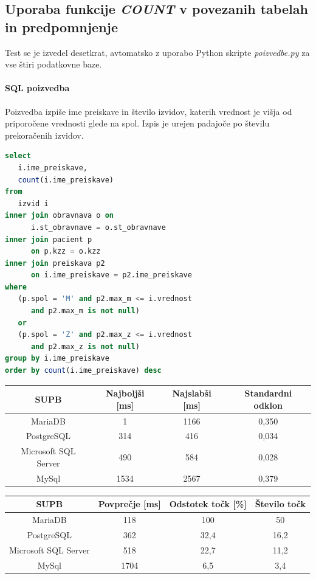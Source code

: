 \documentclass[a4paper,11pt]{report}
\begin{document}
\subsection{Uporaba funkcije \textit{COUNT} v povezanih tabelah in predpomnjenje}
Test se je izvedel desetkrat, avtomatsko z uporabo Python skripte \textit{poizvedbe.py} za vse štiri podatkovne baze.

\paragraph{SQL poizvedba}
Poizvedba izpiše ime preiskave in število izvidov, katerih vrednost je višja od priporočene vrednosti glede na spol.
Izpis je urejen padajoče po številu prekoračenih izvidov.
\pagebreak
\begin{lstlisting}[language = SQL]
select
   i.ime_preiskave,
   count(i.ime_preiskave)
from
   izvid i
inner join obravnava o on 
      i.st_obravnave = o.st_obravnave
inner join pacient p 
      on p.kzz = o.kzz
inner join preiskava p2 
      on i.ime_preiskave = p2.ime_preiskave
where
   (p.spol = 'M' and p2.max_m <= i.vrednost 
      and p2.max_m is not null) 
   or
   (p.spol = 'Z' and p2.max_z <= i.vrednost 
      and p2.max_z is not null)
group by i.ime_preiskave
order by count(i.ime_preiskave) desc
\end{lstlisting}

\begin{center}
   \begin{tabular}{||c|c|c|c||}
      \hline
      \textbf{SUPB} & \textbf{Najboljši [ms]} & \textbf{Najslabši [ms]} & \textbf{Standardni odklon}\\
      \hline
      \hline
      MariaDB & 1 & 1166 & 0,350 \\
      PostgreSQL & 314 & 416 & 0,034 \\
      Microsoft SQL Server & 490 & 584 & 0,028 \\
      MySql & 1534 & 2567 & 0,379\\
      \hline
   \end{tabular}
\end{center}

\begin{center}
   \begin{tabular}{||c|c|c|c||}
      \hline
      \textbf{SUPB} & \textbf{Povprečje [ms]} & \textbf{Odstotek točk [\%]} & \textbf{Število točk}\\
      \hline
      \hline
      MariaDB & 118 & 100 & 50 \\
      PostgreSQL & 362 & 32,4 & 16,2\\
      Microsoft SQL Server & 518 & 22,7 & 11,2 \\
      MySql & 1704 & 6,5 & 3,4 \\
      \hline
   \end{tabular}
\end{center}
\end{document}
